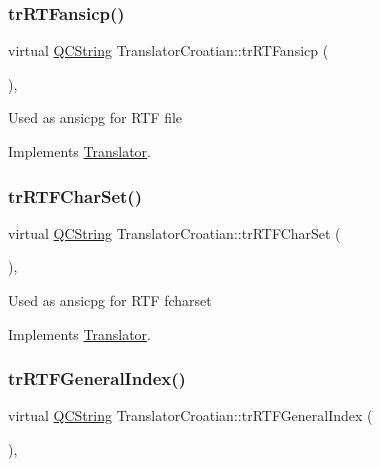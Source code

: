 \subsubsection{\texorpdfstring{trRTFansicp()}{trRTFansicp()}}
{\footnotesize\ttfamily virtual \mbox{\hyperlink{class_q_c_string}{Q\+C\+String}} Translator\+Croatian\+::tr\+R\+T\+Fansicp (\begin{DoxyParamCaption}{ }\end{DoxyParamCaption})\hspace{0.3cm}{\ttfamily [inline]}, {\ttfamily [virtual]}}

Used as ansicpg for R\+TF file 

Implements \mbox{\hyperlink{class_translator_a9953a4c0e6a4fc7d017abcd5c2939e0f}{Translator}}.

\mbox{\label{class_translator_croatian_a1d7d6ab4fe3d62e5eaf1060da020cca2}} 
\subsubsection{\texorpdfstring{trRTFCharSet()}{trRTFCharSet()}}
{\footnotesize\ttfamily virtual \mbox{\hyperlink{class_q_c_string}{Q\+C\+String}} Translator\+Croatian\+::tr\+R\+T\+F\+Char\+Set (\begin{DoxyParamCaption}{ }\end{DoxyParamCaption})\hspace{0.3cm}{\ttfamily [inline]}, {\ttfamily [virtual]}}

Used as ansicpg for R\+TF fcharset 

Implements \mbox{\hyperlink{class_translator_afad391f3cbfb5ce6332b7239f8e2049a}{Translator}}.

\mbox{\label{class_translator_croatian_ad6f887a03290a0f091c66dce049629c0}} 
\subsubsection{\texorpdfstring{trRTFGeneralIndex()}{trRTFGeneralIndex()}}
{\footnotesize\ttfamily virtual \mbox{\hyperlink{class_q_c_string}{Q\+C\+String}} Translator\+Croatian\+::tr\+R\+T\+F\+General\+Index (\begin{DoxyParamCaption}{ }\end{DoxyParamCaption})\hspace{0.3cm}{\ttfamily [inline]}, {\ttfamily [virtual]}}

